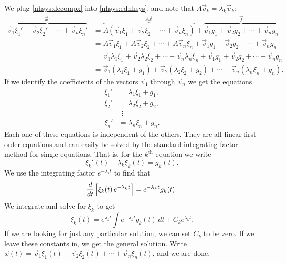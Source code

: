 We plug \eqref{nhsys:decompx} into \eqref{nhsys:ednhsys}, and note that
$A \vec{v}_k = \lambda_k \vec{v}_k$:
\begin{equation*}
\begin{split}
\overbrace{
\vec{v}_1 \xi_1' + 
\vec{v}_2 \xi_2' + \cdots +
\vec{v}_n \xi_n'
}^{{\vec{x}}'}
& =
\overbrace{
A \left( \vec{v}_1 \xi_1 + 
\vec{v}_2 \xi_2 + \cdots +
\vec{v}_n \xi_n \right)
}^{A\vec{x}}
+
\overbrace{
\vec{v}_1 g_1 + 
\vec{v}_2 g_2 + \cdots +
\vec{v}_n g_n
}^{\vec{f}}
\\
& = 
A \vec{v}_1 \xi_1 + 
A \vec{v}_2 \xi_2 + \cdots +
A \vec{v}_n \xi_n
+
\vec{v}_1 g_1 + 
\vec{v}_2 g_2 + \cdots +
\vec{v}_n g_n
\\
& =
\vec{v}_1 \lambda_1 \xi_1 + 
\vec{v}_2 \lambda_2 \xi_2 + \cdots +
\vec{v}_n \lambda_n \xi_n
+
\vec{v}_1 g_1 + 
\vec{v}_2 g_2 + \cdots +
\vec{v}_n g_n
\\
& =
\vec{v}_1 ( \lambda_1 \xi_1 + g_1 ) +
\vec{v}_2 ( \lambda_2 \xi_2 + g_2 ) + \cdots + 
\vec{v}_n ( \lambda_n \xi_n + g_n ) .
\end{split}
\end{equation*}
If we identify the coefficients of the vectors $\vec{v}_1$ through
$\vec{v}_n$ we get the
equations
\begin{align*}
\xi_1' & = \lambda_1 \xi_1 + g_1 , \\
\xi_2' & = \lambda_2 \xi_2 + g_2 , \\
& ~~ \vdots \\
\xi_n' & = \lambda_n \xi_n + g_n .
\end{align*}
Each one of these equations is independent of the others.  They are all
linear first order equations and can easily be solved by the standard
integrating factor method for single equations.
That is, for the $k^{\text{th}}$
equation we write
\begin{equation*}
\xi_k'(t) - \lambda_k \xi_k(t) = g_k(t) .
\end{equation*}
We use the integrating factor $e^{-\lambda_k t}$ to find that
\begin{equation*}
\frac{d}{dt}\Bigl[ \xi_k(t) \, e^{-\lambda_k t} \Bigr] = 
e^{-\lambda_k t} g_k(t) .
\end{equation*}
We integrate and solve for $\xi_k$ to get
\begin{equation*}
\xi_k(t) =  e^{\lambda_k t} 
\int e^{-\lambda_k t} g_k(t) \,dt + C_k e^{\lambda_k t} .
\end{equation*}
If we are looking for just any particular solution, we can set
$C_k$ to be zero.  If we leave these constants in, we get the
general solution.  Write
$\vec{x}(t) =
\vec{v}_1 \xi_1(t) + 
\vec{v}_2 \xi_2(t) + \cdots +
\vec{v}_n \xi_n(t)$, and we are done.

